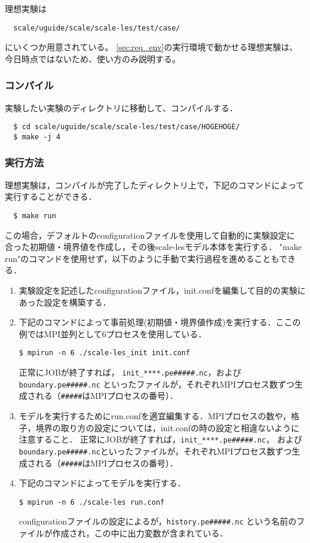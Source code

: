 
理想実験は
\begin{verbatim}
  scale/uguide/scale/scale-les/test/case/
\end{verbatim}
にいくつか用意されている。
\ref{sec:req_env}の実行環境で動かせる理想実験は、
今日時点ではないため、使い方のみ説明する。


\subsubsection{コンパイル}
実験したい実験のディレクトリに移動して、コンパイルする．
\begin{verbatim}
  $ cd scale/uguide/scale/scale-les/test/case/HOGEHOGE/
  $ make -j 4
\end{verbatim}

\subsubsection{実行方法}
理想実験は，コンパイルが完了したディレクトリ上で，下記のコマンドによって
実行することができる．
\begin{verbatim}
  $ make run
\end{verbatim}
この場合，デフォルトのconfigurationファイルを使用して自動的に実験設定に
合った初期値・境界値を作成し，その後scale-lesモデル本体を実行する．
"make run"のコマンドを使用せず，以下のように手動で実行過程を進めることもできる．

\begin{enumerate}
\item 実験設定を記述したconfigurationファイル，init.confを編集して目的の実験にあった設定を構築する．

\item 下記のコマンドによって事前処理(初期値・境界値作成)を実行する．ここの例ではMPI並列として6プロセスを使用している．
\begin{verbatim}
$ mpirun -n 6 ./scale-les_init init.conf
\end{verbatim}
正常にJOBが終了すれば，
\verb|init_****.pe#####.nc|，および\verb|boundary.pe#####.nc|
といったファイルが，それぞれMPIプロセス数ずつ生成される（\verb|#####|はMPIプロセスの番号）．

\item モデルを実行するためにrun.confを適宜編集する．MPIプロセスの数や，格子，境界の取り方の設定については，init.confの時の設定と相違ないように注意すること．
正常にJOBが終了すれば，\verb|init_****.pe#####.nc|，
および\verb|boundary.pe#####.nc|といったファイルが，それぞれMPIプロセス数ずつ生成される（\verb|#####|はMPIプロセスの番号）．

\item 下記のコマンドによってモデルを実行する．
\begin{verbatim}
$ mpirun -n 6 ./scale-les run.conf
\end{verbatim}
configurationファイルの設定によるが，\verb|history.pe#####.nc|
という名前のファイルが作成され，この中に出力変数が含まれている．
\end{enumerate}

